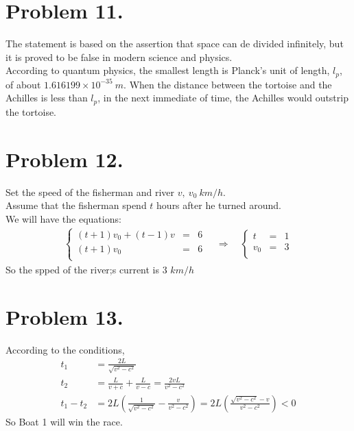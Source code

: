 \documentclass{article}
\begin{document}
\section*{Problem 11.}
The statement is based on the assertion that space can de divided infinitely, but it is proved to be false in modern science and physics.\\
According to quantum physics, the smallest length is Planck's unit of length, $l_p$, of about $1.616199\times 10^{-35}\ m$.
When the distance between the tortoise and the Achilles is less than $l_p$, in the next immediate of time, the Achilles would outstrip the tortoise.

\section*{Problem 12.}
Set the speed of the fisherman and river $v,\ v_0\ km/h$.\\
Assume that the fisherman spend $t$ hours after he turned around.\\
We will have the equations:
\begin{eqnarray*}
\left\{
\begin{array}{lll}
(t+1)v_0+(t-1)v&=&6\\
(t+1)v_0&=&6\\
\end{array}
\right.\quad\Rightarrow\quad
\left\{
\begin{array}{lll}
t&=&1\\
v_0&=&3\\
\end{array}
\right.
\end{eqnarray*} 
So the spped of the river;s current is 3 $km/h$


\section*{Problem 13.}
According to the conditions,
\begin{align*}
t_1&=\frac{2L}{\sqrt{v^2-c^2}}\\
t_2&=\frac{L}{v+c}+\frac{L}{v-c}=\frac{2vL}{v^2-c^2}\\
t_1-t_2&=2L\left(\frac{1}{\sqrt{v^2-c^2}}-\frac{v}{v^2-c^2}\right)=2L\left(\frac{\sqrt{v^2-c^2}-v}{v^2-c^2}\right)<0
\end{align*}
So Boat 1 will win the race.
\end{document}
